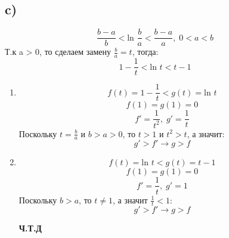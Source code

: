 \documentclass[a4paper,12pt]{article}
\begin{document}
\subsection*{c)}
\[
\frac{b-a}{b} < \text{ln } \frac{b}{a} < \frac{b-a}{a}, \; 0 < a < b
\]
Т.к a > 0, то сделаем замену $\frac{b}{a} = t$, тогда:
\[
1 - \frac{1}{t} < \text{ln } t < t - 1
\]
\begin{enumerate}
\item
\[
f(t) = 1 - \frac{1}{t} < g(t) = \text{ln } t
\]
\[
f(1) = g(1) = 0
\]
\[
f' = \frac{1}{t^2}, \; g' = \frac{1}{t}
\]
Поскольку $t = \frac{b}{a}$ и $ b > a  > 0$, то $t > 1$ и $t^2 > t$, а значит:
\[
g' > f' \rightarrow g > f
\]
\item
\[
f(t) = \text{ln } t < g(t) =  t - 1
\]
\[
f(1) = g(1) = 0
\]
\[
f' = \frac{1}{t}, \; g' = 1
\]
Поскольку $ b > a$, то $t \neq 1$, а значит $\frac{1}{t} < 1$:
\[
g' > f' \rightarrow g > f
\]
\begin{center}
\textbf{Ч.Т.Д}
\end{center}
\end{enumerate}
\end{document}
